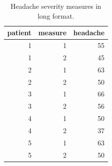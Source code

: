 \documentclass[]{book}\usepackage[]{graphicx}\usepackage[]{color}
\begin{document}
\begin{table}[ht]
\centering
\caption{Headache severity measures in long format.} 
\label{tab:analysisprepost1}
\begin{tabular}{rrr}
  \hline
patient & measure & headache \\ 
  \hline
1 & 1 & 55 \\ 
  1 & 2 & 45 \\ 
  2 & 1 & 63 \\ 
  2 & 2 & 50 \\ 
  3 & 1 & 66 \\ 
  3 & 2 & 56 \\ 
  4 & 1 & 50 \\ 
  4 & 2 & 37 \\ 
  5 & 1 & 63 \\ 
  5 & 2 & 50 \\ 
   \hline
\end{tabular}
\end{table}
\end{document}
